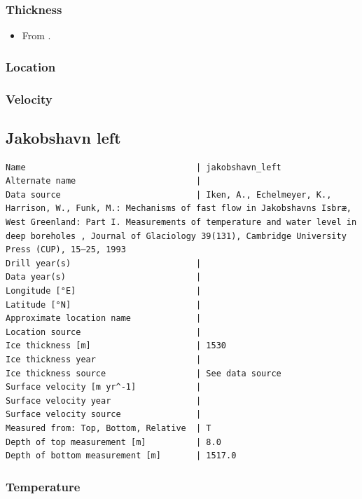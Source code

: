 \documentclass[article,a4paper,times,11pt,twoside]{article}
\begin{document}
\subsubsection{Thickness}
\label{sec:org52fc289}

\begin{itemize}
\item From \textcite{iken_1993}.
\end{itemize}

\subsubsection{Location}
\label{sec:orgacd4394}

\subsubsection{Velocity}
\label{sec:org3449df1}
\clearpage
\subsection{Jakobshavn left}
\label{sec:org1c8025c}
\begin{verbatim}
Name                                  | jakobshavn_left
Alternate name                        | 
Data source                           | Iken, A., Echelmeyer, Κ., Harrison, W., Funk, M.: Mechanisms of fast flow in Jakobshavns Isbræ, West Greenland: Part I. Measurements of temperature and water level in deep boreholes , Journal of Glaciology 39(131), Cambridge University Press (CUP), 15–25, 1993 
Drill year(s)                         | 
Data year(s)                          | 
Longitude [°E]                        | 
Latitude [°N]                         | 
Approximate location name             | 
Location source                       | 
Ice thickness [m]                     | 1530
Ice thickness year                    | 
Ice thickness source                  | See data source
Surface velocity [m yr^-1]            | 
Surface velocity year                 | 
Surface velocity source               | 
Measured from: Top, Bottom, Relative  | T
Depth of top measurement [m]          | 8.0
Depth of bottom measurement [m]       | 1517.0
\end{verbatim}

\subsubsection{Temperature}
\label{sec:org1ab5e19}
\end{document}
